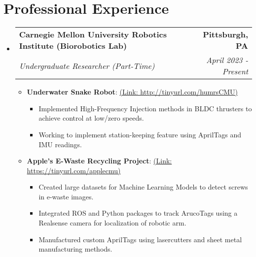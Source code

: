 \documentclass[letterpaper,10pt]{article}
\makeatletter
\newcommand{\resumeItem}[2]{
  \item\small{
    \textbf{#1}{: #2 \vspace{-2pt}}
  }
}
\newcommand{\resumeSubheading}[4]{
  \vspace{-1pt}\item
    \begin{tabular*}{0.97\textwidth}{l@{\extracolsep{\fill}}r}
      \textbf{#1} & \textbf{#2} \\
      \textit{#3} & \textit{#4} \\
    \end{tabular*}\vspace{-5pt}
}
\newcommand{\resumeSubHeadingListStart}{\begin{itemize}[leftmargin=*]}
\newcommand{\resumeSubHeadingListEnd}{\end{itemize}}
\newcommand{\resumeItemListStart}{\begin{itemize}}
\newcommand{\resumeItemListEnd}{\end{itemize}\vspace{-5pt}}
\makeatother
\begin{document}
\section{Professional Experience}
    \resumeSubHeadingListStart
        \resumeSubheading
            {Carnegie Mellon University Robotics Institute (Biorobotics Lab)}{Pittsburgh, PA}
            {Undergraduate Researcher (Part-Time)}{April 2023 -  Present}
            \resumeItemListStart
                \resumeItem{Underwater Snake Robot}
                    {\href{http://tinyurl.com/humrsCMU}{(Link: http://tinyurl.com/humrsCMU)}}
                    \begin{itemize}
                      \item Implemented High-Frequency Injection methods in BLDC thrusters to achieve control at low/zero speeds.
                      \item Working to implement station-keeping feature using AprilTags and IMU readings.
                    \end{itemize}
                \resumeItem{Apple's E-Waste Recycling Project}
                    {\href{https://tinyurl.com/applecmu}{(Link: https://tinyurl.com/applecmu)}}
                    \begin{itemize}
                      \item Created large datasets for Machine Learning Models to detect screws in e-waste images.
                      \item Integrated ROS and Python packages to track ArucoTags using a Realsense camera for localization of robotic arm.
                      \item Manufactured custom AprilTags using lasercutters and sheet metal manufacturing methods.
                    \end{itemize}
            \resumeItemListEnd
      \resumeSubHeadingListEnd
\vspace{-5pt}
\end{document}
